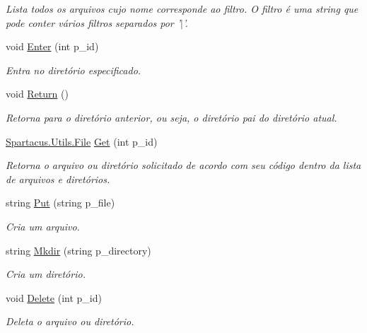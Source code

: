 \begin{DoxyCompactItemize}
\begin{DoxyCompactList}\small\item\em Lista todos os arquivos cujo nome corresponde ao filtro. O filtro é uma string que pode conter vários filtros separados por '$\vert$'. \end{DoxyCompactList}\item 
void \hyperlink{classSpartacus_1_1Utils_1_1FileExplorer_ac9273b0e7cd1365d67c60b9255e6f538}{Enter} (int p\+\_\+id)
\begin{DoxyCompactList}\small\item\em Entra no diretório especificado. \end{DoxyCompactList}\item 
void \hyperlink{classSpartacus_1_1Utils_1_1FileExplorer_a79d43d93289567d3d0544d9c7b61949e}{Return} ()
\begin{DoxyCompactList}\small\item\em Retorna para o diretório anterior, ou seja, o diretório pai do diretório atual. \end{DoxyCompactList}\item 
\hyperlink{classSpartacus_1_1Utils_1_1File}{Spartacus.\+Utils.\+File} \hyperlink{classSpartacus_1_1Utils_1_1FileExplorer_a75222d9146d14fb15e5fe46b0fa1f3c9}{Get} (int p\+\_\+id)
\begin{DoxyCompactList}\small\item\em Retorna o arquivo ou diretório solicitado de acordo com seu código dentro da lista de arquivos e diretórios. \end{DoxyCompactList}\item 
string \hyperlink{classSpartacus_1_1Utils_1_1FileExplorer_ad6f65e809b0c424f639dde8d6fd5d85f}{Put} (string p\+\_\+file)
\begin{DoxyCompactList}\small\item\em Cria um arquivo. \end{DoxyCompactList}\item 
string \hyperlink{classSpartacus_1_1Utils_1_1FileExplorer_a40dcbbe8a4d5def3f833e528466047b7}{Mkdir} (string p\+\_\+directory)
\begin{DoxyCompactList}\small\item\em Cria um diretório. \end{DoxyCompactList}\item 
void \hyperlink{classSpartacus_1_1Utils_1_1FileExplorer_ac36b8cdbb3a886587a8891d61fa8ed90}{Delete} (int p\+\_\+id)
\begin{DoxyCompactList}\small\item\em Deleta o arquivo ou diretório. \end{DoxyCompactList}\item 

\end{DoxyCompactItemize}
